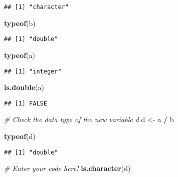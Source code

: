 \documentclass[
]{article}
\newenvironment{Shaded}{\begin{snugshade}}{\end{snugshade}}
\newcommand{\CommentTok}[1]{\textcolor[rgb]{0.56,0.35,0.01}{\textit{#1}}}
\newcommand{\FunctionTok}[1]{\textcolor[rgb]{0.13,0.29,0.53}{\textbf{#1}}}
\newcommand{\NormalTok}[1]{#1}
\newcommand{\OtherTok}[1]{\textcolor[rgb]{0.56,0.35,0.01}{#1}}
\newcommand{\SpecialCharTok}[1]{\textcolor[rgb]{0.81,0.36,0.00}{\textbf{#1}}}
\begin{document}
\begin{verbatim}
## [1] "character"
\end{verbatim}

\begin{Shaded}
\begin{Highlighting}[]
\FunctionTok{typeof}\NormalTok{(b)}
\end{Highlighting}
\end{Shaded}

\begin{verbatim}
## [1] "double"
\end{verbatim}

\begin{Shaded}
\begin{Highlighting}[]
\FunctionTok{typeof}\NormalTok{(a)}
\end{Highlighting}
\end{Shaded}

\begin{verbatim}
## [1] "integer"
\end{verbatim}

\begin{Shaded}
\begin{Highlighting}[]
\FunctionTok{is.double}\NormalTok{(a)}
\end{Highlighting}
\end{Shaded}

\begin{verbatim}
## [1] FALSE
\end{verbatim}

\begin{Shaded}
\begin{Highlighting}[]
\CommentTok{\# Check the data type of the new variable \textquotesingle{}d\textquotesingle{}}
\NormalTok{d }\OtherTok{\textless{}{-}}\NormalTok{ a }\SpecialCharTok{/}\NormalTok{ b}

\FunctionTok{typeof}\NormalTok{(d)}
\end{Highlighting}
\end{Shaded}

\begin{verbatim}
## [1] "double"
\end{verbatim}

\begin{Shaded}
\begin{Highlighting}[]
\CommentTok{\# Enter your code here!}
\FunctionTok{is.character}\NormalTok{(d)}
\end{Highlighting}
\end{Shaded}
\end{document}
